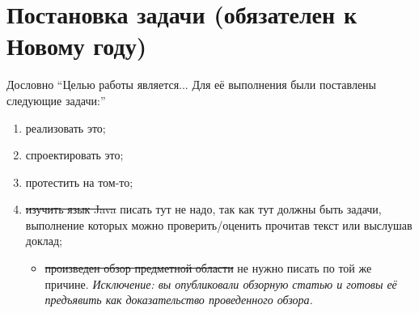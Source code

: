 
\section{Постановка задачи (обязателен к Новому году)}
\label{sec:task}
 Дословно \enquote{Целью работы является... Для её выполнения были постав\-лены следующие задачи:}
 \begin{enumerate}
 \item  реализовать это;
 \item  спроектировать это;
 \item  протестить на том-то;
 \item \sout{изучить язык Java} писать тут не надо, так как тут должны быть задачи, выполнение которых можно проверить/оценить прочитав текст или выслушав доклад;
   \begin{itemize}
   \item \sout{произведен обзор предметной области} не нужно писать по той же причине. \emph{Исключение: вы опубликовали обзорную статью и готовы её предъявить как доказательство проведенного обзора.}
   \end{itemize}
 \end{enumerate}
